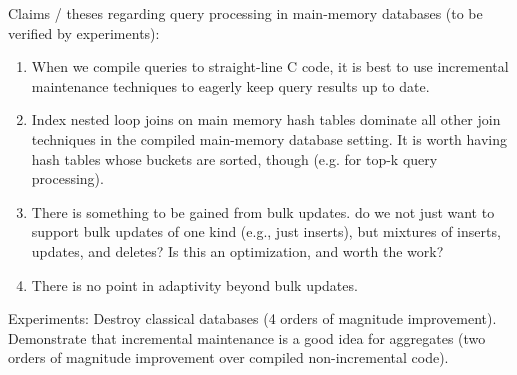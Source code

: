 {Claims / theses regarding query processing in main-memory databases (to be verified by experiments):
\begin{enumerate}
\item
When we compile queries to straight-line C code, it is best to use incremental
maintenance techniques to eagerly keep query results up to date.

\item
Index nested loop joins on main memory hash tables
dominate all other join techniques in the compiled
main-memory database setting.
It is worth having hash tables whose buckets are sorted, though (e.g. for
top-k query processing).

\item
There is something to be gained from bulk updates.
do we not just want to support bulk updates of one kind (e.g., just inserts),
but mixtures of inserts, updates, and deletes? Is this an optimization, and
worth the work?

\item
There is no point in adaptivity beyond bulk updates.
\end{enumerate}


Experiments:
Destroy classical databases (4 orders of magnitude improvement). Demonstrate
that incremental maintenance is a good idea for aggregates (two orders
of magnitude improvement over compiled non-incremental code).
}
